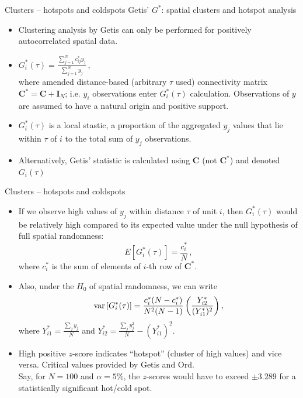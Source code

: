 \documentclass{beamer}
\begin{document}
\begin{frame}{Clusters -- hotspots and coldspots}
Getis' $G^{\ast}$: spatial clusters and hotspot analysis\\
\smallskip
\begin{itemize}
    \item Clustering analysis by Getis can only be performed for positively autocorrelated spatial data.
    \smallskip
    \item $G_i^{\ast}(\tau) = \frac{\sum_{j=1}^N c_{ij}^{\ast} y_j}{\sum_{j=1}^N y_j} \,,$\\
    \smallskip
    where amended distance-based (arbitrary $\tau$ used) connectivity matrix $\bm{C}^{\ast} = \bm{C}+\bm{I}_N$; i.e. $y_i$ observations enter $G_i^{\ast}(\tau)$ calculation. Observations of $y$ are assumed to have a natural origin and positive support.
    \smallskip
    \item $G_i^{\ast}(\tau)$ is a local stastic, a proportion of the aggregated $y_j$ values that lie within $\tau$ of $i$ to the total sum of $y_j$ observations.
    \smallskip
    \item Alternatively, Getis' statistic is calculated using $\bm{C}$ (not $\bm{C}^{\ast}$) and denoted $G_i(\tau)$ 
\end{itemize}
\end{frame}
\begin{frame}{Clusters -- hotspots and coldspots}
\begin{itemize}
    \item If we observe high values of $y_j$ within distance $\tau$ of unit $i$, then $G_i^{\ast}(\tau)$ would be relatively high compared to its expected value under the null hypothesis of full spatial randomness: $$E \left[G_i^{\ast}(\tau) \right] = \frac{c_i^{\ast}}{N}\,,$$ where $c_i^{\ast}$ is the sum of elements of $i$-th row of $\bm{C}^{\ast}$.
    \medskip 
    \item Also, under the $H_0$ of spatial randomness, we can write
    $$
    \textnormal{var} \left[G_i^*(\tau) \right] = 
    \frac{c_i^*(N-c_i^*)}{N^2 (N-1)}
    \left( \frac{Y_{i2}^*}{(Y_{i1}^*)^2} \right) , 
    $$ 
    where $Y_{i1}^*=\tfrac{\sum_j y_j}{N}$ and $Y_{i2}^*=\tfrac{\sum_j y_j^2}{N}-(Y_{i1}^*)^2$.
    \medskip 
    \item High positive $z$-score indicates ``hotspot'' (cluster of high values) and vice versa. Critical values provided by Getis and Ord. \\Say, for $N = 100$ and $\alpha = 5\%$, the $z$-scores would have to exceed $\pm 3.289$ for a statistically significant hot/cold spot.
\end{itemize}
\end{frame}
\end{document}
